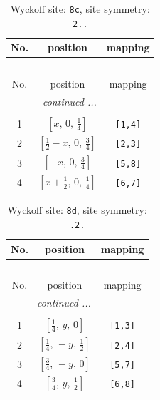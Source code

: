 \documentclass[fleqn,8pt]{jsarticle}
\begin{document}
\renewcommand{\arraystretch}{1.2}
\begin{longtable}{ccc}
\caption{Wyckoff site: {\tt 8c}, site symmetry: {\tt 2..}}
 \\
 \hline \hline
No. & position & mapping \\ \hline \endfirsthead

\multicolumn{2}{l}{\tablename\ \thetable{}} \\
 \hline \hline
No. & position & mapping \\ \hline \endhead

 \hline \hline
\multicolumn{2}{r}{\footnotesize\it continued ...} \\ \endfoot

 \hline \hline
\multicolumn{2}{r}{} \\ \endlastfoot

1 & $\left[ x,\, 0,\, \frac{1}{4} \right]$ & {\tt [1,4]} \\ \hline
2 & $\left[ \frac{1}{2} - x,\, 0,\, \frac{3}{4} \right]$ & {\tt [2,3]} \\ \hline
3 & $\left[ - x,\, 0,\, \frac{3}{4} \right]$ & {\tt [5,8]} \\ \hline
4 & $\left[ x + \frac{1}{2},\, 0,\, \frac{1}{4} \right]$ & {\tt [6,7]} \\
\end{longtable}
\renewcommand{\arraystretch}{1.2}
\begin{longtable}{ccc}
\caption{Wyckoff site: {\tt 8d}, site symmetry: {\tt .2.}}
 \\
 \hline \hline
No. & position & mapping \\ \hline \endfirsthead

\multicolumn{2}{l}{\tablename\ \thetable{}} \\
 \hline \hline
No. & position & mapping \\ \hline \endhead

 \hline \hline
\multicolumn{2}{r}{\footnotesize\it continued ...} \\ \endfoot

 \hline \hline
\multicolumn{2}{r}{} \\ \endlastfoot

1 & $\left[ \frac{1}{4},\, y,\, 0 \right]$ & {\tt [1,3]} \\ \hline
2 & $\left[ \frac{1}{4},\, - y,\, \frac{1}{2} \right]$ & {\tt [2,4]} \\ \hline
3 & $\left[ \frac{3}{4},\, - y,\, 0 \right]$ & {\tt [5,7]} \\ \hline
4 & $\left[ \frac{3}{4},\, y,\, \frac{1}{2} \right]$ & {\tt [6,8]} \\
\end{longtable}
\end{document}
